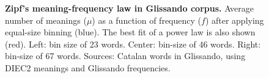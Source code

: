 \documentclass[10pt,letterpaper]{article}
\newif\ifarxiv
\begin{document}
\begin{figure}[!h]
\ifarxiv
\centering
\begin{minipage}{0.32\textwidth}
\centering
\texttt{[image: DIEC2\_GLISSANDO\_senseCG\_freq\_grup\_1\_one\_plot\_nou\_LS.png]}
\end{minipage}
\hspace*{\fill}
\begin{minipage}{0.32\textwidth}
\centering
\texttt{[image: DIEC2\_GLISSANDO\_senseCG\_freq\_grup\_5\_one\_plot\_nou\_LS.png]}
\end{minipage}
\hspace*{\fill}
\begin{minipage}{0.32\textwidth}
\centering
\texttt{[image: DIEC2\_GLISSANDO\_senseCG\_freq\_grup\_10\_one\_plot\_nou\_LS.png]}
\end{minipage}
\fi
\caption{\textbf{Zipf's meaning-frequency law in Glissando corpus. } 
Average number of meanings ($\mu$) as a function of frequency ($f$) after applying equal-size binning (blue). The best fit of a power law is also shown (red). Left: bin size of 23 words. Center: bin-size of 46 words. Right: bin-size of 67 words. Sources: Catalan words in Glissando, using DIEC2 meanings and Glissando frequencies.}
\label{fig7}
\end{figure}
\end{document}
